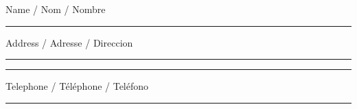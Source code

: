 \vspace*{0.2in}
{
\begin{spacing}{1.2}
\sffamily\fontsize{4}{4}\selectfont
\noindent Name / Nom / Nombre
\end{spacing}
}
\vspace{0.3in}
\hrule
\vspace{0.1in}
{
\begin{spacing}{1.2}
\sffamily\fontsize{4}{4}\selectfont
\noindent Address / Adresse / Direccion
\end{spacing}
}
\vspace{0.3in}
\hrule
\vspace{0.2in}
\hrule
\vspace{0.1in}
{
\begin{spacing}{1.2}
\sffamily\fontsize{4}{4}\selectfont
\noindent Telephone / Téléphone / Teléfono
\end{spacing}
}
\vspace{0.3in}
\hrule
\vspace{0.1in}
\restoregeometry